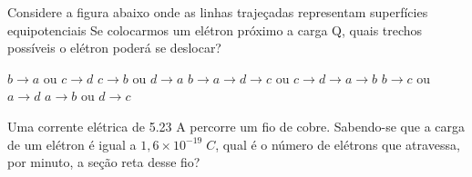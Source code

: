 \documentclass[12pt, addpoints]{exam}
\begin{document}
        \begin{questions}
\begin{multicols*}{2}
\question Considere a figura abaixo onde as linhas trajeçadas representam superfícies equipotenciais Se colocarmos um elétron próximo a carga Q, quais trechos possíveis o elétron poderá se deslocar?
        
        \begin{center}
            \begin{minipage}[c]{0.5\linewidth}
            \end{minipage}
        \end{center}
        
        

\begin{choices}
\choice $b\rightarrow a$ ou $c\rightarrow d$ 
\choice $c\rightarrow b$ ou $d\rightarrow a$ 
\choice $b\rightarrow a\rightarrow d\rightarrow c$ ou $c\rightarrow d\rightarrow a\rightarrow b$ 
\choice $b\rightarrow c$ ou $a\rightarrow d$ 
\choice $a\rightarrow b$ ou $d\rightarrow c$ 
\end{choices}
\question Uma corrente elétrica de    5.23 A percorre um ﬁo de cobre. Sabendo-se que a carga de um elétron é igual a $1,6\times 10^{-19}\;C$, qual é o número de elétrons que atravessa, por minuto, a seção reta desse ﬁo?


\end{multicols*}
\end{questions}
\end{document}

